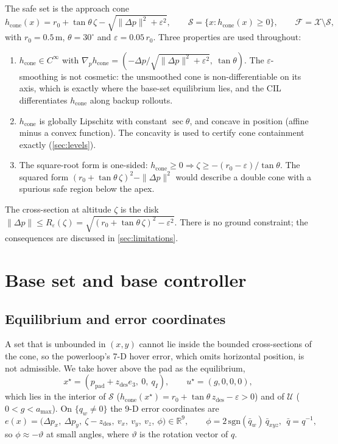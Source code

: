 \documentclass[11pt,a4paper]{article}
\newcommand{\R}{\mathbb{R}}
\newcommand{\X}{\mathcal{X}}
\newcommand{\U}{\mathcal{U}}
\newcommand{\Sset}{\mathcal{S}}
\newcommand{\Fset}{\mathcal{F}}
\newcommand{\hc}{h_{\mathrm{cone}}}
\newcommand{\zd}{z_{\mathrm{des}}}
\begin{document}
The safe set is the approach cone
\begin{equation}
\hc(x)=r_0+\tan\theta\,\zeta-\sqrt{\|\Delta p\|^2+\varepsilon^2},\qquad
\Sset=\{x:\hc(x)\ge 0\},\qquad \Fset=\X\setminus\Sset,
\label{eq:cone}
\end{equation}
with $r_0=0.5$\,m, $\theta=30^\circ$ and $\varepsilon=0.05\,r_0$. Three properties are used throughout:
\begin{enumerate}
\item $\hc\in C^\infty$ with $\nabla_p\hc=(-\Delta p/\sqrt{\|\Delta p\|^2+\varepsilon^2},\ \tan\theta)$. The
$\varepsilon$-smoothing is not cosmetic: the unsmoothed cone is non-differentiable on its axis, which is
exactly where the base-set equilibrium lies, and the CIL differentiates $\hc$ along backup rollouts.
\item $\hc$ is globally Lipschitz with constant $\sec\theta$, and concave in position (affine minus a
convex function). The concavity is used to certify cone containment exactly (\cref{sec:levels}).
\item The square-root form is one-sided: $\hc\ge0\Rightarrow\zeta\ge-(r_0-\varepsilon)/\tan\theta$. The
squared form $(r_0+\tan\theta\,\zeta)^2-\|\Delta p\|^2$ would describe a double cone with a spurious safe
region below the apex.
\end{enumerate}
The cross-section at altitude $\zeta$ is the disk $\|\Delta p\|\le R_\varepsilon(\zeta)=\sqrt{(r_0+\tan\theta\,\zeta)^2-\varepsilon^2}$.
There is no ground constraint; the consequences are discussed in \cref{sec:limitations}.

\section{Base set and base controller}

\subsection{Equilibrium and error coordinates}
A set that is unbounded in $(x,y)$ cannot lie inside the bounded cross-sections of the cone, so the
powerloop's 7-D hover error, which omits horizontal position, is not admissible. We take hover above the
pad as the equilibrium,
\begin{equation}
x^\star=(p_{\mathrm{pad}}+\zd e_3,\ 0,\ q_I),\qquad u^\star=(g,0,0,0),
\end{equation}
which lies in the interior of $\Sset$ ($\hc(x^\star)=r_0+\tan\theta\,\zd-\varepsilon>0$) and of $\U$
($0<g<a_{\max}$). On $\{q_w\neq0\}$ the 9-D error coordinates are
\begin{equation}
e(x)=\big(\Delta p_x,\ \Delta p_y,\ \zeta-\zd,\ v_x,\ v_y,\ v_z,\ \phi\big)\in\R^9,\qquad
\phi=2\,\mathrm{sgn}(\bar q_w)\,\bar q_{xyz},\ \ \bar q=q^{-1},
\label{eq:err}
\end{equation}
so $\phi\approx-\vartheta$ at small angles, where $\vartheta$ is the rotation vector of $q$.
\end{document}

